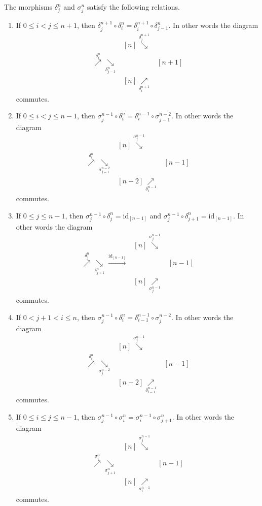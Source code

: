 \begin{lemma}
The morphisms $\delta^n_j$ and $\sigma^n_j$ satisfy the following relations.
\begin{enumerate}
\item If $0 \leq i < j \leq n + 1$, then
$\delta^{n + 1}_j \circ \delta^n_i =
\delta^{n + 1}_i \circ \delta^n_{j - 1}$.
In other words the diagram
$$
\begin{array}{ccc} & [n] \overset{\delta^{n + 1}_j}{\searrow} &  \\ [n - 1] \overset{\delta^n_i}{\nearrow}\underset{\delta^n_{j - 1}}{\searrow} &  & [n + 1] \\  & [n] \underset{\delta^{n + 1}_i}{\nearrow} & \end{array}
$$
commutes.
\item If $0 \leq i < j \leq n - 1$, then
$\sigma^{n - 1}_j \circ \delta^n_i =
\delta^{n - 1}_i \circ \sigma^{n - 2}_{j - 1}$.
In other words the diagram
$$
\begin{array}{ccc} & [n] \overset{\sigma^{n - 1}_j}{\searrow} &  \\ [n - 1] \overset{\delta^n_i}{\nearrow}\underset{\sigma^{n - 2}_{j - 1}}{\searrow} &  & [n - 1] \\  & [n - 2] \underset{\delta^{n - 1}_i}{\nearrow} & \end{array}
$$
commutes.
\item If $0 \leq j \leq n - 1$, then
$\sigma^{n - 1}_j \circ \delta^n_j = \text{id}_{[n - 1]}$
and
$\sigma^{n - 1}_j \circ \delta^n_{j + 1} = \text{id}_{[n - 1]}$.
In other words the diagram
$$
\begin{array}{ccc} & [n] \overset{\sigma^{n - 1}_j}{\searrow} &  \\ [n - 1]
\overset{\delta^n_j}{\nearrow}\underset{\delta^n_{j + 1}}{\searrow}\overset{\text{id}_{[n - 1]}}{\longrightarrow} &  & [n - 1] \\  & [n] \underset{\sigma^{n - 1}_j}{\nearrow} & \end{array}
$$
commutes.
\item If $0 < j + 1 < i \leq n$, then
$\sigma^{n - 1}_j \circ \delta^n_i =
\delta^{n - 1}_{i - 1} \circ \sigma^{n - 2}_j$.
In other words the diagram
$$
\begin{array}{ccc} & [n] \overset{\sigma^{n - 1}_j}{\searrow} &  \\ [n - 1] \overset{\delta^n_i}{\nearrow}\underset{\sigma^{n - 2}_j}{\searrow} &  & [n - 1] \\  & [n - 2] \underset{\delta^{n - 1}_{i - 1}}{\nearrow} & \end{array}
$$
commutes.
\item If $0 \leq i \leq j \leq n - 1$, then
$\sigma^{n - 1}_j \circ \sigma^n_i =
\sigma^{n - 1}_i \circ \sigma^n_{j + 1}$.
In other words the diagram
$$
\begin{array}{ccc} & [n] \overset{\sigma^{n - 1}_j}{\searrow} &  \\ [n + 1] \overset{\sigma^n_i}{\nearrow}\underset{\sigma^n_{j + 1}}{\searrow} &  & [n - 1] \\  & [n] \underset{\sigma^{n - 1}_i}{\nearrow} & \end{array}
$$
commutes.
\end{enumerate}
\end{lemma}


